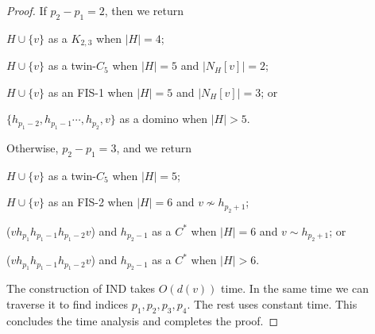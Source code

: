 \documentclass[10pt]{article}
\begin{document}
\begin{proof}
  If $p_2 - p_1 = 2$, then we return
  \begin{inparaenum}[(\itshape 1\upshape)]
  \item $H\cup \{v\}$ as a $K_{2,3}$ when $|H|=4$;
  \item $H\cup \{v\}$ as a twin-$C_5$ when $|H|=5$ and $|N_H[v]| = 2$;
  \item $H\cup \{v\}$ as an FIS-1 when $|H|=5$ and $|N_H[v]| = 3$; or
  \item $\{h_{p_1-2}, h_{p_1 - 1} \cdots, h_{p_2},v\}$ as a domino
    when $|H|>5$.
  \end{inparaenum}
  Otherwise, $p_2 - p_1 = 3$, and we return
  \begin{inparaenum}[(\itshape 1\upshape)]
  \item $H\cup \{v\}$ as a twin-$C_5$ when $|H|=5$;
  \item $H\cup \{v\}$ as an FIS-2 when $|H|=6$ and $v\not\sim
    h_{p_2+1}$;
  \item ($v h_{p_1} h_{p_1-1} h_{p_1-2} v$) and $h_{p_2-1}$ as a $C^*$
    when $|H|=6$ and $v\sim h_{p_2+1}$; or
  \item ($v h_{p_1} h_{p_1-1} h_{p_1-2} v$) and $h_{p_2-1}$ as a $C^*$ when
    $|H|>6$.
  \end{inparaenum}

  The construction of {\sf IND} takes $O(d(v))$ time.  In the same
  time we can traverse it to find indices $p_1,p_2,p_3,p_4$.  The rest
  uses constant time.  This concludes the time analysis and completes
  the proof.
\end{proof}
\end{document}
